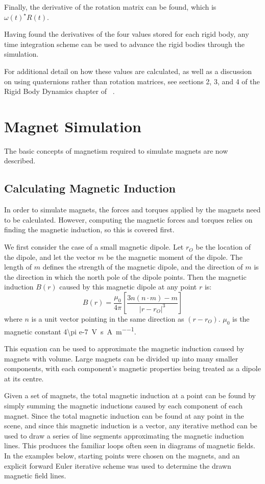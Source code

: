 \documentclass[tog]{acmsiggraph}
\begin{document}
Finally, the derivative of the rotation matrix can be found, which is $\omega(t)^{\star}R(t)$.

Having found the derivatives of the four values stored for each rigid body, any time integration scheme can be used to advance the rigid bodies through the simulation.

For additional detail on how these values are calculated, as well as a discussion on using quaternions rather than rotation matrices, see sections 2, 3, and 4 of the Rigid Body Dynamics chapter of ~\cite{pixarnotes}.

\section{Magnet Simulation}

The basic concepts of magnetism required to simulate magnets are now described.

\subsection{Calculating Magnetic Induction}

In order to simulate magnets, the forces and torques applied by the magnets need to be calculated. However, computing the magnetic forces and torques relies on finding the magnetic induction, so this is covered first.

We first consider the case of a small magnetic dipole. Let $r_O$ be the location of the dipole, and let the vector $m$ be the magnetic moment of the dipole. The length of $m$ defines the strength of the magnetic dipole, and the direction of $m$ is the direction in which the north pole of the dipole points. Then the magnetic induction $B(r)$ caused by this magnetic dipole at any point $r$ is:
\begin{equation}
B(r) = \frac{\mu_0}{4\pi}\left[\frac{3n(n\cdot m) - m}{\left|r - r_O\right|^3}\right]
\end{equation}
where $n$ is a unit vector pointing in the same direction as $(r - r_O)$. $\mu_0$ is the magnetic constant \SI[per-mode=fraction]{4\pi e-7}{\volt \second \per \ampere \per \metre}.

This equation can be used to approximate the magnetic induction caused by magnets with volume. Large magnets can be divided up into many smaller components, with each component's magnetic properties being treated as a dipole at its centre.

Given a set of magnets, the total magnetic induction at a point can be found by simply summing the magnetic inductions caused by each component of each magnet. Since the total magnetic induction can be found at any point in the scene, and since this magnetic induction is a vector, any iterative method can be used to draw a series of line segments approximating the magnetic induction lines. This produces the familiar loops often seen in diagrams of magnetic fields. In the examples below, starting points were chosen on the magnets, and an explicit forward Euler iterative scheme was used to determine the drawn magnetic field lines.
\end{document}
